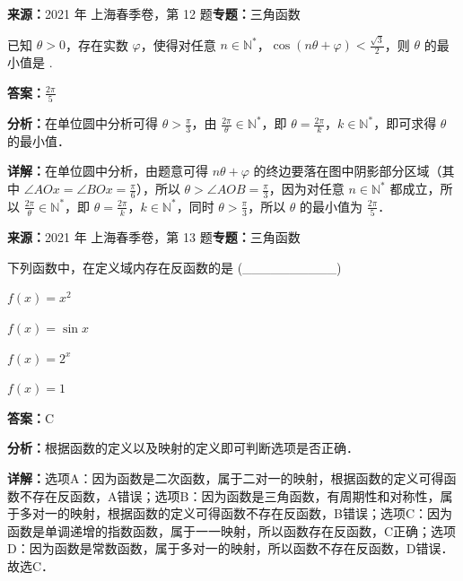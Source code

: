 \begin{question}[points=5]
\textbf{来源：}2021 年 上海春季卷，第 12 题\quad \textbf{专题：}三角函数\par
已知 $\theta>0$，存在实数 $\varphi$，使得对任意 $n\in\mathbb{N}^*$，$\cos(n\theta+\varphi)<\frac{\sqrt{3}}{2}$，则 $\theta$ 的最小值是  .
\fillin[{$\frac{2\pi}{5}$}]
\begin{solution}
\textbf{答案：}$\frac{2\pi}{5}$

\textbf{分析：}在单位圆中分析可得 $\theta>\frac{\pi}{3}$，由 $\frac{2\pi}{\theta}\in\mathbb{N}^*$，即 $\theta=\frac{2\pi}{k}$，$k\in\mathbb{N}^*$，即可求得 $\theta$ 的最小值．

\textbf{详解：}在单位圆中分析，由题意可得 $n\theta+\varphi$ 的终边要落在图中阴影部分区域（其中 $\angle AOx=\angle BOx=\frac{\pi}{6}$），所以 $\theta>\angle AOB=\frac{\pi}{3}$，因为对任意 $n\in\mathbb{N}^*$ 都成立，所以 $\frac{2\pi}{\theta}\in\mathbb{N}^*$，即 $\theta=\frac{2\pi}{k}$，$k\in\mathbb{N}^*$，同时 $\theta>\frac{\pi}{3}$，所以 $\theta$ 的最小值为 $\frac{2\pi}{5}$．
\end{solution}
\end{question}

\begin{question}[points=5]
\textbf{来源：}2021 年 上海春季卷，第 13 题\quad \textbf{专题：}三角函数\par
下列函数中，在定义域内存在反函数的是 (\_\_\_\_\_\_\_\_\_\_)
\begin{choices}
  \item $f(x)=x^2$
  \item $f(x)=\sin x$
  \item $f(x)=2^x$
  \item $f(x)=1$
\end{choices}
\begin{solution}
\textbf{答案：}C

\textbf{分析：}根据函数的定义以及映射的定义即可判断选项是否正确．

\textbf{详解：}选项A：因为函数是二次函数，属于二对一的映射，根据函数的定义可得函数不存在反函数，A错误；选项B：因为函数是三角函数，有周期性和对称性，属于多对一的映射，根据函数的定义可得函数不存在反函数，B错误；选项C：因为函数是单调递增的指数函数，属于一一映射，所以函数存在反函数，C正确；选项D：因为函数是常数函数，属于多对一的映射，所以函数不存在反函数，D错误．故选C．
\end{solution}
\end{question}

